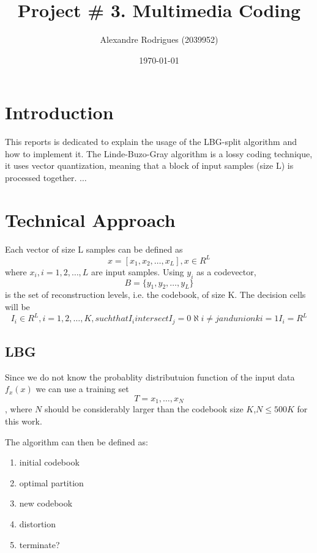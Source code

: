 \documentclass[a4paper, 11pt]{article}
\begin{document}
	
	\title{Project \# 3. Multimedia Coding }
	\author{{\small Alexandre Rodrigues (2039952)}}
	\date{\today}
	\maketitle
	
	\section{Introduction}
		This reports is dedicated to explain the usage of the LBG-split algorithm and how to implement it.
		The Linde-Buzo-Gray algorithm is a lossy coding technique, it uses vector quantization, meaning that a block of input samples (size L) is processed together.
		$\ldots$
	
	\section{Technical Approach}
		Each vector of size L samples can be defined as
		\begin{equation}
			x = [x_1, x_2, \ldots, x_L], x \in R^L
		\end{equation}
		where $x_i, i=1,2,\ldots,L$ are input samples. 
		Using $y_i $ as a codevector, 
		\begin{equation}
			B =  \{y_1, y_2, \ldots, y_L\}
		\end{equation} 
		is the set of reconstruction levels, i.e. the codebook, of size K.
		The decision cells will be
		\begin{equation}
			I_i \in R^L, i = 1, 2, \ldots, K, such that I_i intersect I_j = 0 \aleph i \neq j and union k i=1 I_i = R^L
		\end{equation} 
	
		\subsection{LBG}
			Since we do not know the probablity distributuion function of the input data $ f_x(x) $ we can use a training set
			\begin{equation}
				T = {x_1,\ldots,x_N}
			\end{equation},
			where $N$ should be considerably larger than the codebook size $ K $,$  N \le 500K $ for this work.
			
			The algorithm can then be defined as:
			\begin{enumerate}
				\item initial codebook
				\item optimal partition
				\item new codebook
				\item distortion
				\item terminate?
			\end{enumerate}
		
\end{document}
